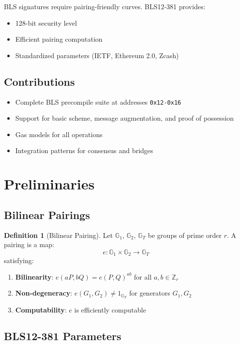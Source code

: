 \documentclass[11pt,a4paper]{article}
\theoremstyle{definition}
\newtheorem{definition}{Definition}
\begin{document}
BLS signatures require pairing-friendly curves. BLS12-381 provides:
\begin{itemize}
    \item 128-bit security level
    \item Efficient pairing computation
    \item Standardized parameters (IETF, Ethereum 2.0, Zcash)
\end{itemize}

\subsection{Contributions}

\begin{itemize}
    \item Complete BLS precompile suite at addresses \texttt{0x12-0x16}
    \item Support for basic scheme, message augmentation, and proof of possession
    \item Gas models for all operations
    \item Integration patterns for consensus and bridges
\end{itemize}

\section{Preliminaries}

\subsection{Bilinear Pairings}

\begin{definition}[Bilinear Pairing]
Let $\mathbb{G}_1$, $\mathbb{G}_2$, $\mathbb{G}_T$ be groups of prime order $r$. A pairing is a map:
\[
e: \mathbb{G}_1 \times \mathbb{G}_2 \to \mathbb{G}_T
\]
satisfying:
\begin{enumerate}
    \item \textbf{Bilinearity}: $e(aP, bQ) = e(P, Q)^{ab}$ for all $a, b \in \mathbb{Z}_r$
    \item \textbf{Non-degeneracy}: $e(G_1, G_2) \neq 1_{\mathbb{G}_T}$ for generators $G_1, G_2$
    \item \textbf{Computability}: $e$ is efficiently computable
\end{enumerate}
\end{definition}

\subsection{BLS12-381 Parameters}
\end{document}
